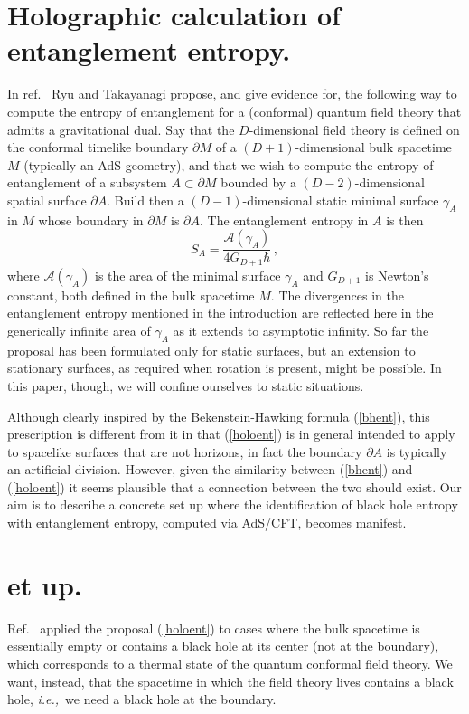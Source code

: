 \documentclass[12pt]{article}
\newcommand{\beq}{\begin{equation}}
\newcommand{\eeq}{\end{equation}}
\newcommand{\ie}{{\it i.e.,}\ }
\newcommand{\reef}[1]{(\ref{#1})}
\begin{document}
\section{Holographic calculation of entanglement entropy.} In
ref.~\cite{ryta} Ryu and Takayanagi propose, and give evidence for, the
following way to compute the entropy of entanglement for a (conformal)
quantum field theory that admits a gravitational dual. Say that the
$D$-dimensional field theory is defined on the conformal timelike
boundary $\partial M$ of a $(D+1)$-dimensional bulk spacetime $M$
(typically an AdS geometry), and that we wish to compute the entropy of
entanglement of a subsystem $A\subset \partial M$ bounded by a
$(D-2)$-dimensional spatial surface $\partial A$. Build then a
$(D-1)$-dimensional static minimal surface $\gamma_A$ in $M$ whose
boundary in $\partial M$ is $\partial A$. The entanglement entropy in
$A$ is then 
\beq
\label{holoent} S_A=\frac{\mathcal{A}(\gamma_A)}{4
G_{D+1} \hbar}\,, 
\eeq 
where $\mathcal{A}(\gamma_A)$ is the area of the
minimal surface $\gamma_A$ and $G_{D+1}$ is Newton's constant, both
defined in the bulk spacetime $M$. The divergences in the entanglement
entropy mentioned in the introduction are reflected here in the
generically infinite area of $\gamma_A$ as it extends to asymptotic
infinity. So far the proposal has been formulated only for static
surfaces, but an extension to stationary surfaces, as required when
rotation is present, might be possible. In this paper, though, we will
confine ourselves to static situations.

Although clearly inspired by the Bekenstein-Hawking formula
\reef{bhent}, this prescription is different from it in that
\reef{holoent} is in general intended to apply to spacelike surfaces
that are not horizons, in fact the boundary $\partial A$ is typically an
artificial division. However, given the similarity between \reef{bhent}
and \reef{holoent} it seems plausible that a connection between the two
should exist. Our aim is to describe a concrete set up where the
identification of black hole entropy with entanglement entropy, computed
via AdS/CFT, becomes manifest.


\section{et up.} Ref.~\cite{ryta} applied the proposal
\reef{holoent} to cases where the bulk spacetime is essentially empty or
contains a black hole at its center (not at the boundary), which
corresponds to a thermal state of the quantum conformal field theory. We
want, instead, that the spacetime in which the field theory lives
contains a black hole, \ie we need a black hole at the boundary.
\end{document}
